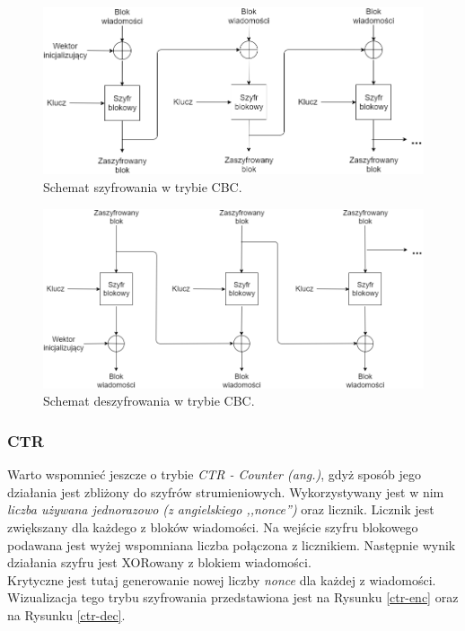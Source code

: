 \begin{figure}
    \centering
	\includegraphics[width=\textwidth]{content/images/cbc-enc-scheme}
    \caption{Schemat szyfrowania w trybie CBC.}
    \label{cbc-enc}
\end{figure}
\begin{figure}
    \centering
	\includegraphics[width=\textwidth]{content/images/cbc-dec-scheme}
    \caption{Schemat deszyfrowania w trybie CBC.}
    \label{cbc-dec}
\end{figure}

\subsubsection{CTR}
Warto wspomnieć jeszcze o trybie \textit{CTR - Counter (ang.)}, gdyż sposób jego działania jest zbliżony 
do szyfrów strumieniowych. Wykorzystywany jest w nim \textit{liczba używana jednorazowo (z angielskiego ,,nonce'')}
oraz licznik. Licznik jest zwiększany dla każdego z bloków wiadomości. 
Na wejście szyfru blokowego podawana jest wyżej wspomniana liczba połączona z licznikiem. Następnie wynik
działania szyfru jest XORowany z blokiem wiadomości. \\
Krytyczne jest tutaj generowanie nowej liczby \textit{nonce} dla każdej z wiadomości. \\
Wizualizacja tego trybu szyfrowania przedstawiona jest na Rysunku \ref{ctr-enc} oraz na Rysunku \ref{ctr-dec}.

